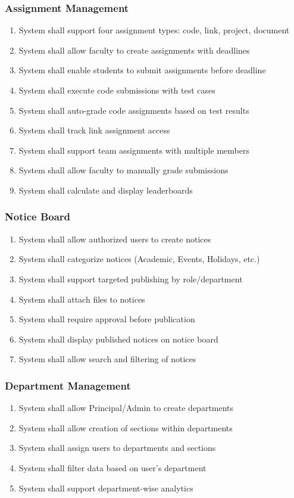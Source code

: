 \subsubsection{Assignment Management}
\begin{enumerate}[label=FR-ASN-\arabic*]
\item System shall support four assignment types: code, link, project, document
\item System shall allow faculty to create assignments with deadlines
\item System shall enable students to submit assignments before deadline
\item System shall execute code submissions with test cases
\item System shall auto-grade code assignments based on test results
\item System shall track link assignment access
\item System shall support team assignments with multiple members
\item System shall allow faculty to manually grade submissions
\item System shall calculate and display leaderboards
\end{enumerate}

\subsubsection{Notice Board}
\begin{enumerate}[label=FR-NOT-\arabic*]
\item System shall allow authorized users to create notices
\item System shall categorize notices (Academic, Events, Holidays, etc.)
\item System shall support targeted publishing by role/department
\item System shall attach files to notices
\item System shall require approval before publication
\item System shall display published notices on notice board
\item System shall allow search and filtering of notices
\end{enumerate}

\subsubsection{Department Management}
\begin{enumerate}[label=FR-DEPT-\arabic*]
\item System shall allow Principal/Admin to create departments
\item System shall allow creation of sections within departments
\item System shall assign users to departments and sections
\item System shall filter data based on user's department
\item System shall support department-wise analytics
\end{enumerate}


